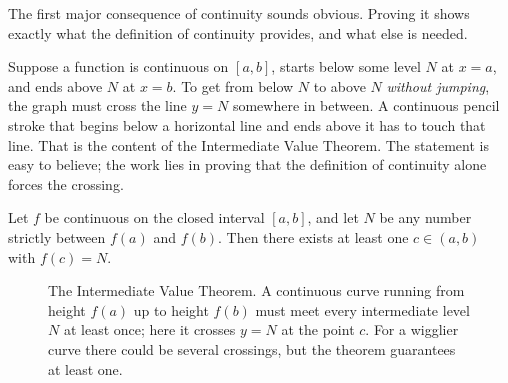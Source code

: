 The first major consequence of continuity sounds obvious. Proving it shows exactly what
the definition of continuity provides, and what else is needed.

\begin{intuitionbox}
Suppose a function is continuous on $[a,b]$, starts below some level $N$ at $x=a$, and ends
above $N$ at $x=b$. To get from below $N$ to above $N$ \emph{without jumping}, the graph
must cross the line $y=N$ somewhere in between. A continuous pencil stroke that begins below
a horizontal line and ends above it has to touch that line. That is the content of
the Intermediate Value Theorem. The statement is easy to believe; the work lies in proving that
the definition of continuity alone forces the crossing.
\end{intuitionbox}

\begin{theorem}
\label{ch08:thm-ivt}
Let $f$ be continuous on the closed interval $[a,b]$, and let $N$ be any number strictly
between $f(a)$ and $f(b)$. Then there exists at least one $c\in(a,b)$ with $f(c)=N$.
\end{theorem}

\begin{figure}[htbp]
\centering
{}
\caption{The Intermediate Value Theorem. A continuous curve running from height $f(a)$ up
to height $f(b)$ must meet every intermediate level $N$ at least once; here it crosses
$y=N$ at the point $c$. For a wigglier curve there could be several crossings, but the
theorem guarantees at least one.}
\label{ch08:fig-ivt}
\end{figure}


